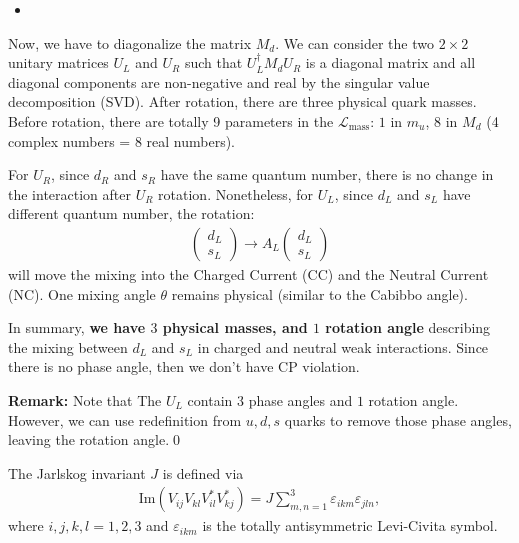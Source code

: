 \begin{itemize}
    \item [(b)]
\end{itemize}
Now, we have to diagonalize the matrix $M_d$. We can consider the two $2\times2$ unitary matrices $U_L$ and $U_R$ such that $U_L^\dagger M_d U_R$ is a diagonal matrix and all diagonal components are non-negative and real by the singular value decomposition (SVD). After rotation, there are three physical quark masses. Before rotation, there are totally 9 parameters in the $\mathcal{L}_\text{mass}$: $1$ in $m_u$, 8 in $M_d$ (4 complex numbers = 8 real numbers). 

For $U_R$, since $d_R$ and $s_R$ have the same quantum number, there is no change in the interaction after $U_R$ rotation. Nonetheless, for $U_L$, since $d_L$ and $s_L$ have different quantum number, the rotation:
\begin{align}
\begin{pmatrix} d_L \\ s_L \end{pmatrix} \to A_L \begin{pmatrix} d_L \\ s_L \end{pmatrix}
\end{align}
will move the mixing into the Charged Current (CC) and the Neutral Current (NC). One mixing angle $\theta$ remains physical (similar to the Cabibbo angle).

In summary, \textbf{we have $3$ physical masses, and $1$ rotation angle} describing the mixing between $d_L$ and $s_L$ in charged and neutral weak interactions. Since there is no phase angle, then we don't have CP violation.

\textbf{Remark:} Note that The $U_L$ contain $3$ phase angles and $1$ rotation angle. However, we can use redefinition from $u,d,s$ quarks to remove those phase angles, leaving the rotation angle.\qed


\clearpage
{}

The Jarlskog invariant $J$ is defined via 
\begin{align}
    \text{Im}(V_{ij} V_{kl} V_{il}^* V_{kj}^*) = J \sum_{m,n=1}^3 \varepsilon_{ikm} \varepsilon_{jln},
\end{align}
where $i,j,k,l=1,2,3$ and $\varepsilon_{ikm}$ is the totally antisymmetric Levi-Civita symbol.

